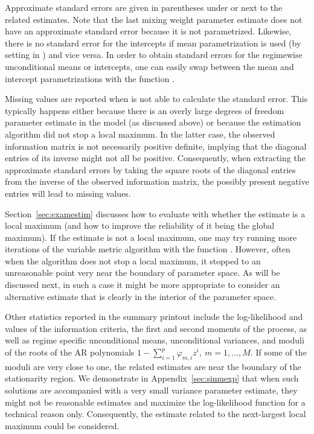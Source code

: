 \documentclass[nojss]{jss} %
\begin{document}
Approximate standard errors are given in parentheses under or next to the related estimates. Note that the last mixing weight parameter estimate does not have an approximate standard error because it is not parametrized. Likewise, there is no standard error for the intercepts if mean parametrization is used (by setting  in ) and vice versa. In order to obtain standard errors for the regimewise unconditional means or intercepts, one can easily swap between the mean and intercept parametrizations with the function .

Missing values are reported when  is not able to calculate the standard error. This typically happens either because there is an overly large degrees of freedom parameter estimate in the model (as discussed above) or because the estimation algorithm did not stop a local maximum. In the latter case, the observed information matrix is not necessarily positive definite, implying that the diagonal entries of its inverse might not all be positive. Consequently, when extracting the approximate standard errors by taking the square roots of the diagonal entries from the inverse of the observed information matrix, the possibly present negative entries will lead to missing values.

Section~\ref{sec:examestim} discusses how to evaluate with  whether the estimate is a local maximum (and how to improve the reliability of it being the global maximum). If the estimate is not a local maximum, one may try running more iterations of the variable metric algorithm with the function . However, often when the algorithm does not stop a local maximum, it stopped to an unreasonable point very near the boundary of parameter space. As will be discussed next, in such a case it might be more appropriate to consider an alternative estimate that is clearly in the interior of the parameter space.

Other statistics reported in the summary printout include the log-likelihood and values of the information criteria, the first and second moments of the process, as well as regime specific unconditional means, unconditional variances, and moduli of the roots of the AR polynomials $1-\sum_{i=1}^p\varphi_{m,i}z^i, \ m=1,...,M$. If some of the moduli are very close to one, the related estimates are near the boundary of the stationarity region. We demonstrate in Appendix~\ref{sec:simuexp} that when such solutions are accompanied with a very small variance parameter estimate, they might not be reasonable estimates and maximize the log-likelihood function for a technical reason only. Consequently, the estimate related to the next-largest local maximum could be considered.
\end{document}
